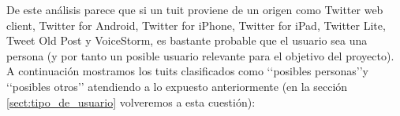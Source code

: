 De este análisis parece que si un tuit proviene de un origen como Twitter web client,
Twitter for Android, Twitter for iPhone, Twitter for iPad, Twitter Lite, Tweet Old Post
y VoiceStorm, es bastante probable que el usuario sea una persona (y por tanto un posible
usuario relevante para el objetivo del proyecto). A continuación mostramos
los tuits clasificados como \lq\lq posibles personas\rq\rq y \lq\lq posibles otros\rq\rq
atendiendo a lo expuesto anteriormente (en la sección \ref{sect:tipo_de_usuario} volveremos
a esta cuestión):

